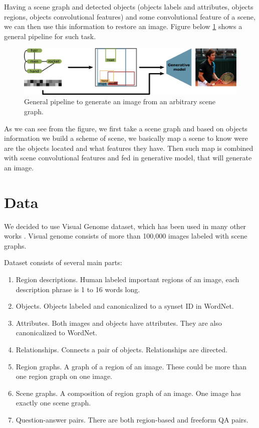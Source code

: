 Having a scene graph and detected objects (objects labels and attributes, objects regions, objects convolutional features) and some convolutional feature of a scene, we can then use this information to restore an image. Figure below \ref{image-generation-from-sg} shows a general pipeline for such task.

\begin{figure}[!h]
    \centering
    \includegraphics[width=\textwidth]{figure/image-generation-from-sg.png}
    \caption{General pipeline to generate an image from an arbitrary scene graph.}
    \label{image-generation-from-sg}
\end{figure}

As we can see from the figure, we first take a scene graph and based on objects information we build a scheme of scene, we basically map a scene to know were are the objects located and what features they have. Then such map is combined with scene convolutional features and fed in generative model, that will generate an image.

\chapter{Data}

We decided to use Visual Genome dataset, which has been used in many other works \cite{Krishna_Zhu_Groth_Johnson_Hata_Kravitz_Chen_Kalantidis_Li_Shamma_etal_2016}. Visual genome consists of more than 100,000 images labeled with scene graphs.

Dataset consists of several main parts:

\begin{enumerate}
    \item Region descriptions. Human labeled important regions of an image, each description phrase is 1 to 16 words long.
    \item Objects. Objects labeled and canonicalized to a synset ID in WordNet.
    \item Attributes. Both images and objects have attributes. They are also canonicalized to WordNet.
    \item Relationships. Connects a pair of objects. Relationships are directed.
    \item Region graphs. A graph of a region of an image. These could be more than one region graph on one image.
    \item Scene graphs. A composition of region graph of an image. One image has exactly one scene graph.
    \item Question-answer pairs. There are both region-based and freeform QA pairs.
\end{enumerate}

